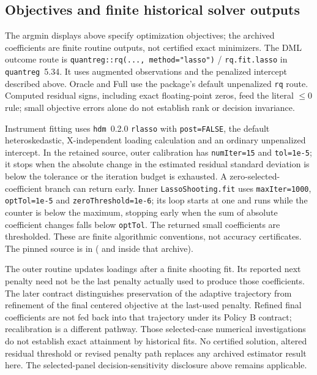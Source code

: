 \subsection{Objectives and finite historical solver outputs}
\label{app:finite-solvers}
The argmin displays above specify optimization objectives; the archived coefficients are finite routine outputs, not certified exact minimizers. The DML outcome route is \texttt{quantreg::rq(..., method="lasso")} / \texttt{rq.fit.lasso} in \texttt{quantreg}~5.34. It uses augmented observations and the penalized intercept described above. Oracle and Full use the package's default unpenalized \texttt{rq} route. Computed residual signs, including exact floating-point zeros, feed the literal $\leq0$ rule; small objective errors alone do not establish rank or decision invariance.

Instrument fitting uses \texttt{hdm}~0.2.0 \texttt{rlasso} with \texttt{post=FALSE}, the default heteroskedastic, X-independent loading calculation and an ordinary unpenalized intercept. In the retained source, outer calibration has \texttt{numIter=15} and \texttt{tol=1e-5}; it stops when the absolute change in the estimated residual standard deviation is below the tolerance or the iteration budget is exhausted. A zero-selected-coefficient branch can return early. Inner \texttt{LassoShooting.fit} uses \texttt{maxIter=1000}, \texttt{optTol=1e-5} and \texttt{zeroThreshold=1e-6}; its loop starts at one and runs while the counter is below the maximum, stopping early when the sum of absolute coefficient changes falls below \texttt{optTol}. The returned small coefficients are thresholded. These are finite algorithmic conventions, not accuracy certificates. The pinned source is in  ( and  inside that archive).

The outer routine updates loadings after a finite shooting fit. Its reported next penalty need not be the last penalty actually used to produce those coefficients. The later contract  distinguishes preservation of the adaptive trajectory from refinement of the final centered objective at the last-used penalty. Refined final coefficients are not fed back into that trajectory under its Policy B contract; recalibration is a different pathway. Those selected-case numerical investigations do not establish exact attainment by historical fits. No certified solution, altered residual threshold or revised penalty path replaces any archived estimator result here. The selected-panel decision-sensitivity disclosure above remains applicable.

